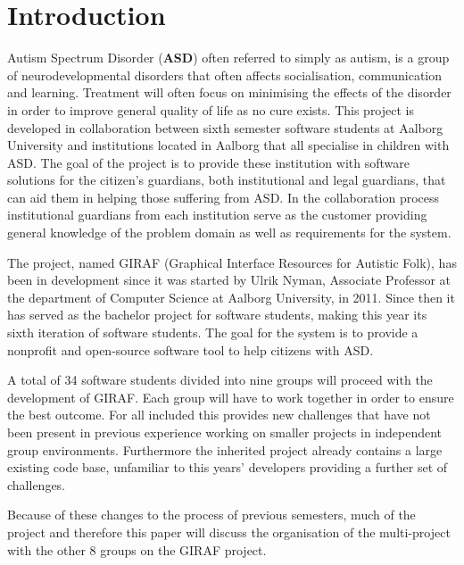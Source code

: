 \chapter{Introduction}
Autism Spectrum Disorder (\textbf{ASD}) often referred to simply as autism, is a 
group of neurodevelopmental disorders that often affects socialisation, communication and learning.
Treatment will often focus on minimising the effects of the disorder in order to improve general quality of life as no cure exists.
This project is developed in collaboration between sixth semester software students at Aalborg University and institutions located in Aalborg that all specialise in children with ASD.
The goal of the project is to provide these institution with software solutions for the citizen's guardians, both institutional and legal guardians, that can aid them in helping those suffering from ASD.
In the collaboration process institutional guardians from each institution serve as the customer providing general knowledge of the problem domain as well as requirements for the system.

The project, named GIRAF (Graphical Interface Resources for Autistic Folk), has been in development since it was started by Ulrik Nyman, Associate Professor at the department of Computer Science at Aalborg University, in 2011. 
Since then it has served as the bachelor project for software students, making this year its sixth iteration of software students.
The goal for the system is to provide a nonprofit and open-source software tool to help citizens with ASD.

A total of 34 software students divided into nine groups will proceed with the development of GIRAF.
Each group will have to work together in order to ensure the best outcome.
For all included this provides new challenges that have not been present in previous experience working on smaller projects in independent group environments.
Furthermore the inherited project already contains a large existing code base, unfamiliar to this years' developers providing a further set of challenges.

Because of these changes to the process of previous semesters, much of the project and therefore this paper will discuss the organisation of the multi-project with the other 8 groups on the GIRAF project.